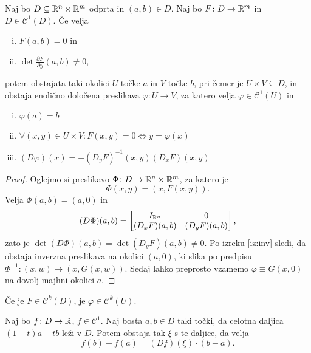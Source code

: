 \begin{izrek}\label{iz:imp}
Naj bo $D \subseteq \mathbb{R}^n \times \mathbb{R}^m$ odprta in $(a,b) \in D$.
Naj bo $F \colon D\to \mathbb{R}^m$ in $D \in \mathcal{C}^1(D)$. Če velja

\begin{enumerate}[i)]
\item $F(a,b) = 0$ in
\item $\det \frac{\partial F}{\partial y}(a,b) \ne 0$,
\end{enumerate}

potem obstajata taki okolici $U$ točke $a$ in $V$ točke $b$, pri
čemer je $U \times V \subseteq D$, in obstaja enolično določena
preslikava $\varphi \colon U \to V$, za katero velja
$\varphi \in \mathcal{C}^1(U)$ in
\begin{enumerate}[i)]
\item $\varphi(a) = b$
\item $\forall (x,y) \in U \times V \colon F(x,y) = 0 \iff
y = \varphi(x)$
\item $(D\varphi)(x) = -(D_yF)^{-1}(x,y) (D_xF)(x,y)$
\end{enumerate}
\end{izrek}

\begin{proof}
Oglejmo si preslikavo $\Phi \colon D \to \mathbb{R}^n \times \mathbb{R}^m$, za
katero je
\[
\Phi(x,y) = (x, F(x,y)).
\]
Velja $\Phi(a,b) = (a,0)$ in
\[
(D\Phi)(a,b) =
\begin{bmatrix}
I_{\mathbb{R}^n}    & 0           \\ 
(D_xF)(a,b) & (D_yF)(a,b)
\end{bmatrix},
\]
zato je $\det(D\Phi)(a,b) = \det (D_yF)(a,b) \ne 0$. Po izreku
\ref{iz:inv} sledi, da obstaja inverzna preslikava na okolici
$(a,0)$, ki slika po predpisu
$\Phi^{-1} \colon (x,w) \mapsto (x, G(x,w))$. Sedaj lahko
preprosto vzamemo $\varphi \equiv G(x,0)$ na dovolj majhni
okolici $a$.
\end{proof}

\begin{opomba}
Če je $F \in \mathcal{C}^k(D)$, je $\varphi \in \mathcal{C}^k(U)$.
\end{opomba}


\begin{lema}
Naj bo $f \colon D \to \mathbb{R}$, $f \in \mathcal{C}^1$. Naj bosta
$a,b \in D$ taki točki, da celotna daljica $(1-t)a + tb$ leži v
$D$.
Potem obstaja tak $\xi$ s te daljice, da velja
\[
f(b) - f(a) = (Df)(\xi) \cdot (b-a).
\]
\end{lema}

